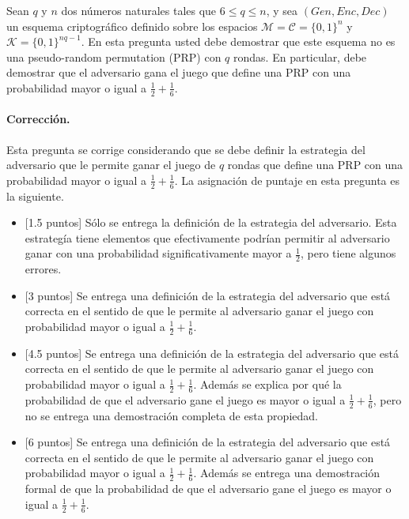 
Sean $q$ y $n$ dos números naturales tales que $6 \leq q \leq n$, y sea $(\textit{Gen}, \textit{Enc}, \textit{Dec})$ un esquema criptográfico definido sobre los espacios $\mathcal{M} = \mathcal{C} = \{0,1\}^n$ y $\mathcal{K} = \{0, 1\}^{nq - 1}$. En esta pregunta usted debe demostrar que este esquema no es una pseudo-random permutation (PRP) con $q$ rondas. En particular, debe demostrar que el adversario gana el juego que define una PRP con una probabilidad mayor o igual a $\frac{1}{2} + \frac{1}{6}$.

\paragraph{Corrección.}
Esta pregunta se corrige considerando que se debe definir la
estrategia del adversario que le permite ganar el juego de $q$ rondas
que define una PRP con una probabilidad mayor o igual a $\frac{1}{2}
+ \frac{1}{6}$. La asignación de puntaje en esta pregunta es la
siguiente.
\begin{itemize}
    \item{[1.5 puntos]} Sólo se entrega la definición de la estrategia
    del adversario. Esta estrategía tiene elementos que efectivamente
    podrían permitir al adversario ganar con una probabilidad
    significativamente mayor a $\frac{1}{2}$, pero tiene algunos
    errores.

    \item{[3 puntos]} Se entrega una definición de la estrategia del
    adversario que está correcta en el sentido de que le permite al
    adversario ganar el juego con probabilidad mayor o igual a
    $\frac{1}{2} + \frac{1}{6}$.

    \item{[4.5 puntos]} Se entrega una definición de la estrategia del
    adversario que está correcta en el sentido de que le permite al
    adversario ganar el juego con probabilidad mayor o igual a
    $\frac{1}{2} + \frac{1}{6}$. Además se explica por qué la
    probabilidad de que el adversario gane el juego es mayor o igual a
    $\frac{1}{2} + \frac{1}{6}$, pero no se entrega una demostración
    completa de esta propiedad.


    \item{[6 puntos]} Se entrega una definición de la estrategia del
    adversario que está correcta en el sentido de que le permite al
    adversario ganar el juego con probabilidad mayor o igual a
    $\frac{1}{2} + \frac{1}{6}$. Además se entrega una demostración
    formal de que la probabilidad de que el adversario gane el juego
    es mayor o igual a $\frac{1}{2} + \frac{1}{6}$.
\end{itemize}

